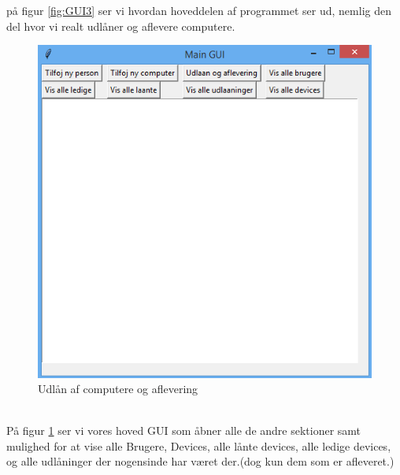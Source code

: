 \documentclass[a4paper]{article}
\begin{document}
på figur \ref{fig:GUI3} ser vi hvordan hoveddelen af programmet ser ud, nemlig den del hvor vi realt udlåner og aflevere computere.
\\[0.1in]
\begin{figure}[h!]
\centering
\includegraphics[width=1\textwidth]{mainGUI.png}
\caption{Udlån af computere og aflevering}
\label{fig:GUI4}
\end{figure}\\
På figur \ref{fig:GUI4} ser vi vores hoved GUI som åbner alle de andre sektioner samt mulighed for at vise alle Brugere, Devices, alle lånte devices, alle ledige devices, og alle udlåninger der nogensinde har været der.(dog kun dem som er afleveret.)
\end{document}
